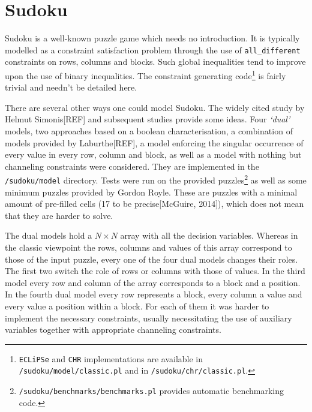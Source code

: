 \section{Sudoku}

Sudoku is a well-known puzzle game which needs no introduction. It is typically modelled as a constraint satisfaction problem through the use of \texttt{all\_different} constraints on rows, columns and blocks. Such global inequalities tend to improve upon the use of binary inequalities. The constraint generating code\footnote{\texttt{ECLiPSe} and \texttt{CHR} implementations are available in \texttt{/sudoku/model/classic.pl} and in \texttt{/sudoku/chr/classic.pl}.} is fairly trivial and needn't be detailed here. \\\par

There are several other ways one could model Sudoku. The widely cited study by Helmut Simonis[REF] and subsequent studies provide some ideas. Four \textit{`dual'} models, two approaches based on a boolean characterisation, a combination of models provided by Laburthe[REF], a model enforcing the singular occurrence of every value in every row, column and block, as well as a model with nothing but channeling constraints were considered. They are implemented in the \texttt{/sudoku/model} directory. Tests were run on the provided puzzles\footnote{\texttt{/sudoku/benchmarks/benchmarks.pl} provides automatic benchmarking code.} as well as some minimum puzzles provided by Gordon Royle. These are puzzles with a minimal amount of pre-filled cells (17 to be precise[McGuire, 2014]), which does not mean that they are harder to solve. \\\par

The dual models hold a $N\times N$ array with all the decision variables. Whereas in the classic viewpoint the rows, columns and values of this array correspond to those of the input puzzle, every one of the four dual models changes their roles. The first two switch the role of rows or columns with those of values. In the third model every row and column of the array corresponds to a block and a position. In the fourth dual model every row represents a block, every column a value and every value a position within a block. For each of them it was harder to implement the necessary constraints, usually necessitating the use of auxiliary variables together with appropriate channeling constraints.\\\par  

